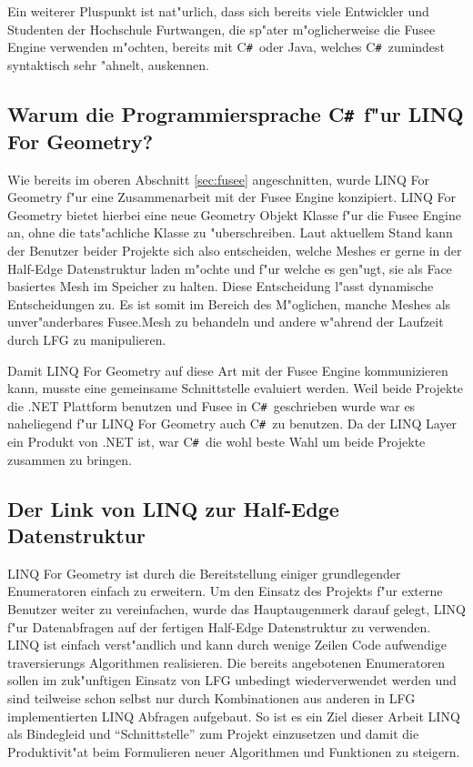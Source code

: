 \documentclass[pagesize, paper=a4, fontsize=12pt,titlepage=true, headings=small, headnosepline, abstractoff, liststotoc, nochapterprefix, plainheadsepline]{scrreprt}
\newcommand{\CSS}{C\texttt{\# }}
\newcommand{\LFG}{LINQ For Geometry}
\newcommand{\LFGS}{LINQ For Geometry }
\newcommand{\HES}{Half-Edge Datenstruktur }
\begin{document}
Ein weiterer Pluspunkt ist nat"urlich, dass sich bereits viele Entwickler und Studenten der Hochschule Furtwangen, die sp"ater m"oglicherweise die Fusee Engine verwenden m"ochten, bereits mit \CSS oder Java, welches \CSS zumindest syntaktisch sehr "ahnelt, auskennen.
		\subsection {Warum die Programmiersprache \CSS f"ur \LFG?}
			Wie bereits im oberen Abschnitt \ref{sec:fusee} angeschnitten, wurde \LFGS f"ur eine Zusammenarbeit mit der Fusee Engine konzipiert. \LFGS bietet hierbei eine neue Geometry Objekt Klasse f"ur die Fusee Engine an, ohne die tats"achliche Klasse zu "uberschreiben. Laut aktuellem Stand kann der Benutzer beider Projekte sich also entscheiden, welche Meshes er gerne in der \HES laden m"ochte und f"ur welche es gen"ugt, sie als Face basiertes Mesh im Speicher zu halten. Diese Entscheidung l"asst dynamische Entscheidungen zu. Es ist somit im Bereich des M"oglichen, manche Meshes als unver"anderbares Fusee.Mesh zu behandeln und andere w"ahrend der Laufzeit durch LFG zu manipulieren.
\newline

Damit \LFGS auf diese Art mit der Fusee Engine kommunizieren kann, musste eine gemeinsame Schnittstelle evaluiert werden. Weil beide Projekte die .NET Plattform benutzen und Fusee in \CSS geschrieben wurde war es naheliegend f"ur \LFGS auch \CSS zu benutzen. Da der LINQ Layer ein Produkt von .NET ist, war \CSS die wohl beste Wahl um beide Projekte zusammen zu bringen.
\subsection {Der Link von LINQ zur \HES}
				\LFGS ist durch die Bereitstellung einiger grundlegender Enumeratoren einfach zu erweitern. Um den Einsatz des Projekts f"ur externe Benutzer weiter zu vereinfachen, wurde das Hauptaugenmerk darauf gelegt, LINQ f"ur Datenabfragen auf der fertigen \HES zu verwenden. LINQ ist einfach verst"andlich und kann durch wenige Zeilen Code aufwendige traversierungs Algorithmen realisieren. Die bereits angebotenen Enumeratoren sollen im zuk"unftigen Einsatz von LFG unbedingt wiederverwendet werden und sind teilweise schon selbst nur durch Kombinationen aus anderen in LFG implementierten LINQ Abfragen aufgebaut. So ist es ein Ziel dieser Arbeit LINQ als Bindegleid und "`Schnittstelle"' zum Projekt einzusetzen und damit die Produktivit"at beim Formulieren neuer Algorithmen und Funktionen zu steigern.
\end{document}
